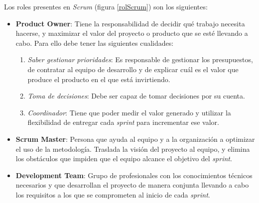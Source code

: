 Los roles presentes en \textit{Scrum} (figura \ref*{rolScrum}) son los siguientes:
\begin{itemize}
    \item \textbf{Product Owner}: Tiene la responsabilidad de decidir qué trabajo necesita hacerse, y maximizar el valor 
    del proyecto o producto que se esté llevando a cabo. Para ello debe tener las siguientes cualidades:
    \begin{enumerate}
        \item \textit{Saber gestionar prioridades}: Es responsable de gestionar los presupuestos, de contratar al equipo de 
        desarrollo y de explicar cuál es el valor que produce el producto en el que está invirtiendo.
        \item \textit{Toma de decisiones}: Debe ser capaz de tomar decisiones por su cuenta.
        \item \textit{Coordinador}: Tiene que poder medir el valor generado y utilizar la flexibilidad de entregar cada 
        \textit{sprint} para incrementar ese valor.
    \end{enumerate}
    
    \item \textbf{Scrum Master}: Persona que ayuda al equipo y a la organización a optimizar el uso de la 
    metodología. Traslada la visión del proyecto al equipo, y elimina los obstáculos que impiden que el equipo alcance el 
    objetivo del \textit{sprint}.

    \item \textbf{Development Team}: Grupo de profesionales con los conocimientos técnicos necesarios y que desarrollan el proyecto de manera
    conjunta llevando a cabo los requisitos a los que se comprometen al inicio de cada \textit{sprint}.
\end{itemize}
